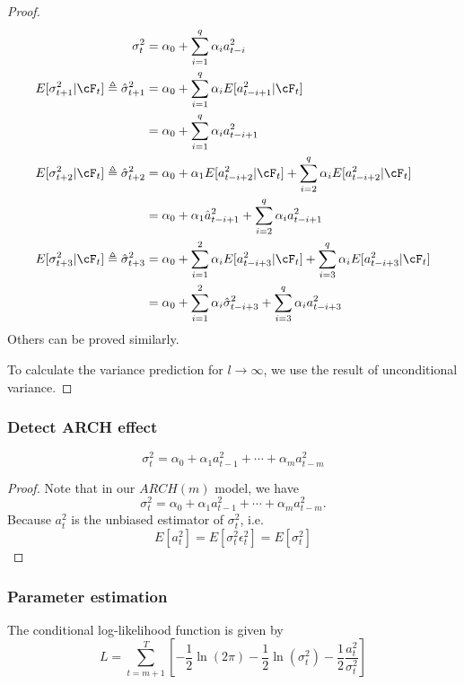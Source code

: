 \begin{proof}
	\begin{align*}
	\sigma_t^2 &= \alpha_0 + \sum_{i=1}^{q}\alpha_i a_{t-i}^2 \\
	E[\sigma_{t+1}^2|\cF_t]\triangleq \hat{\sigma}_{t+1}^2 &= \alpha_0 + \sum_{i=1}^{q}\alpha_i E[a_{t-i+1}^2|\cF_{t}] \\
	&=\alpha_0 + \sum_{i=1}^{q}\alpha_i a_{t-i+1}^2 \\
	E[\sigma_{t+2}^2|\cF_t]\triangleq \hat{\sigma}_{t+2}^2 &= \alpha_0 + \alpha_1 E[a_{t-i+2}^2|\cF_{t}] +\sum_{i=2}^{q}\alpha_i E[a_{t-i+2}^2|\cF_{t}] \\
	&= \alpha_0 + \alpha_1 \hat{a}_{t-i+1}^2 +\sum_{i=2}^{q}\alpha_i a_{t-i+1}^2 \\
	E[\sigma_{t+3}^2|\cF_t]\triangleq \hat{\sigma}_{t+3}^2 &= \alpha_0 + \sum_{i=1}^{2}\alpha_i E[a_{t-i+3}^2|\cF_{t}] +\sum_{i=3}^{q}\alpha_i E[a_{t-i+3}^2|\cF_{t}] \\
	&= \alpha_0 + \sum_{i=1}^{2}\alpha_i \hat{\sigma}_{t-i+3}^2 +\sum_{i=3}^{q}\alpha_i a_{t-i+3}^2 
	\end{align*}
	Others can be proved similarly.	
	
	To calculate the variance prediction for $l\to\infty$, we use the result of unconditional variance.
\end{proof}

\subsubsection{Detect ARCH effect}


\begin{lemma}
	
	$$\sigma_t^2 = \alpha_0 + \alpha_1 a_{t-1}^2 + \cdots + \alpha_m a_{t-m}^2$$
	
	
\end{lemma}
\begin{proof}
Note that in our $ARCH(m)$ model, we have	
	$$\sigma_t^2 = \alpha_0 + \alpha_1 a_{t-1}^2 + \cdots + \alpha_m a_{t-m}^2.$$
Because $a_t^2$ is the unbiased estimator of $\sigma_t^2$, i.e. 
$$E[a_t^2] = E[\sigma_t^2\epsilon_t^2] = E[\sigma_t^2]$$	

\end{proof}


\subsubsection{Parameter estimation}
\begin{lemma}\cite[120]{tsay2005analysis}
	
The conditional log-likelihood function is given by
$$L = \sum_{t=m+1}^T[-\frac{1}{2}\ln (2\pi) - \frac{1}{2}\ln (\sigma_t^2) - \frac{1}{2}\frac{a_t^2}{\sigma_t^2}]$$	
\end{lemma}

